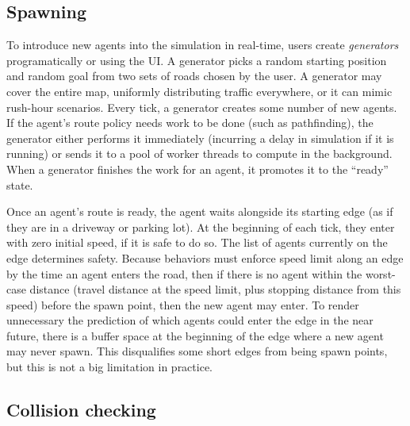 \documentclass[letterpaper, 10 pt, conference]{ieeeconf}  %
\begin{document}

\subsection{Spawning}


To introduce new agents into the simulation in real-time, users create
\emph{generators} programatically or using the UI. A generator picks a random
starting position and random goal from two sets of roads chosen by the user. A
generator may cover the entire map, uniformly distributing traffic everywhere,
or it can mimic rush-hour scenarios. Every tick, a generator creates some number
of new agents.  If the agent's route policy needs work to be done (such as
pathfinding), the generator either performs it immediately (incurring a delay in
simulation if it is running) or sends it to a pool of worker threads to compute
in the background. When a generator finishes the work for an agent, it promotes
it to the ``ready'' state.

Once an agent's route is ready, the agent waits alongside its starting edge (as
if they are in a driveway or parking lot). At the beginning of each tick, they
enter with zero initial speed, if it is safe to do so. The list of agents
currently on the edge determines safety. Because behaviors must enforce speed
limit along an edge by the time an agent enters the road, then if there is no
agent within the worst-case distance (travel distance at the speed limit, plus
stopping distance from this speed) before the spawn point, then the new agent
may enter. To render unnecessary the prediction of which agents could enter the
edge in the near future, there is a buffer space at the beginning of the edge
where a new agent may never spawn. This disqualifies some short edges from being
spawn points, but this is not a big limitation in practice.

\subsection{Collision checking}
\end{document}
